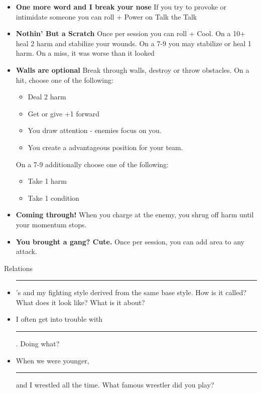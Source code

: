 \documentclass{article}
\begin{document}
\begin{itemize}[label=$\square$]

\item \textbf{One more word and I break your nose} If you try to provoke or intimidate someone you can roll + Power on Talk the Talk

\item \textbf{Nothin’ But a Scratch} Once per session you can roll + Cool. On a 10+ heal 2 harm and stabilize your wounds. On a 7-9 you may stabilize or heal 1 harm. On a miss, it was worse than it looked

\item \textbf{Walls are optional} Break through walls, destroy or throw obstacles. On a hit, choose one of the following:
\vspace{-6pt}
\begin{itemize}
    \setlength\itemsep{-0.5em}
\item Deal 2 harm
\item Get or give +1 forward
\item You draw attention - enemies focus on you.
\item You create a advantageous position for your team.
\end{itemize}
\vspace{-6pt}
On a 7-9 additionally choose one of the following:
\vspace{-6pt}
\begin{itemize}
    \setlength\itemsep{-0.5em}
\item  Take 1 harm
\item  Take 1 condition
\end{itemize}

\item \textbf{Coming through!} When you charge at the enemy, you shrug off harm until your momentum stops.

\item \textbf{You brought a gang? Cute.} Once per session, you can add area to any attack.

\end{itemize}


\Large{}Relations

\medskip

\normalfont\normalsize

\begin{itemize}[label=$\square$]
    \item \rule{2cm}{1pt}’s and my fighting style derived from the same base style. How is it called? What does it look like? What is it about?
    \item I often get into trouble with \rule{2cm}{1pt}. Doing what?
    \item When we were younger, \rule{2cm}{1pt} and I wrestled all the time. What famous wrestler did you play?
\end{itemize}
\end{document}
